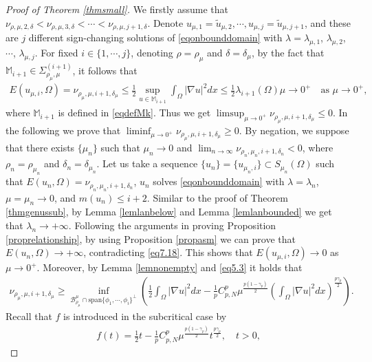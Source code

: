 \documentclass[10pt,a4paper]{amsart}
\newcommand{\B}{\mathcal{B}}
\newcommand{\ga}{\gamma}
\newcommand{\la}{\lambda}
\begin{document}
\begin{proof}[Proof of Theorem \ref{thmsmall}]
We firstly assume that $\nu_{\rho,\mu,2,\delta} < \nu_{\rho,\mu,3,\delta} < \cdots < \nu_{\rho,\mu,j+1,\delta}$. Denote $u_{\mu,1} = \tilde u_{\mu,2}, \cdots, u_{\mu,j} = \tilde u_{\mu,j+1}$, and these are $j$ different sign-changing solutions of \eqref{eqonbounddomain} with $\la = \la_{\mu,1}$, $\la_{\mu,2}$, $\cdots$, $\la_{\mu,j}$. For fixed $i \in \{1,\cdots,j\}$,  denoting $\rho = \rho_\mu$ and $\delta = \delta_\mu$, by the fact that $\mathbb{M}_{i+1}  \in \Sigma_{\rho_\mu,\mu}^{(i+1)}$, it follows that
\begin{align} \label{eq7.18}
	E(u_{\mu,i},\Omega) = \nu_{\rho_\mu,\mu,i+1,\delta_\mu} \le \frac12 \sup_{u \in \mathbb{M}_{i+1}}\int_\Omega |\nabla u|^2dx \le \frac12\la_{i+1}(\Omega) \mu \to 0^+ \quad \text{as } \mu \to 0^+,
\end{align}
where $\mathbb{M}_{i+1}$ is defined in \eqref{eqdefMk}. Thus we get $\limsup_{\mu \to 0^+}\nu_{\rho_\mu,\mu,i+1,\delta_\mu} \le 0$. In the following we prove that $\liminf_{\mu \to 0^+}\nu_{\rho_\mu,\mu,i+1,\delta_\mu} \ge 0$. By negation, we suppose that there exists $\{\mu_n\}$ such that $\mu_n \to 0$ and $\lim_{n \to \infty}\nu_{\rho_n,\mu_n,i+1,\delta_n} < 0$, where $\rho_n = \rho_{\mu_n}$ and $\delta_n = \delta_{\mu_n}$. Let us take a sequence $\{u_n\} = \{u_{\mu_n,i}\} \subset S_{\mu_n}(\Omega)$ such that $E(u_n,\Omega) = \nu_{\rho_n,\mu_n,i+1,\delta_n}$, $u_n$ solves \eqref{eqonbounddomain} with $\la = \la_n$, $\mu = \mu_n \to 0$, and $m(u_n) \le i+2$. Similar to the proof of Theorem \ref{thmgenussub}, by Lemma \ref{lemlanbelow} and Lemma \ref{lemlanbounded} we get that $\la_n \to +\infty$. Following the arguments in proving Proposition \ref{proprelationship}, by using Proposition \ref{propasm} we can prove that $E(u_n,\Omega) \to +\infty$, contradicting \eqref{eq7.18}. This shows that $E(u_{\mu,i},\Omega) \to 0$ as $\mu \to 0^+$. Moreover, by Lemma \ref{lemnonempty} and \eqref{eq5.3} it holds that
\begin{align} \label{eqnuineq}
	\nu_{\rho_\mu,\mu,i+1,\delta_\mu} \geq \inf_{\B_{\rho_\mu}^\mu \cap \text{span}\{\phi_1,\cdots,\phi_{i}\}^{\bot}}\left( \frac12 \int_\Omega |\nabla u|^2dx - \frac1p C_{p,N}^p \mu^{\frac{p(1-\ga_p)}{2}}\left( \int_\Omega |\nabla u|^2dx\right) ^{\frac{p\ga_p}{2}} \right).
\end{align}
Recall that $f$ is introduced in the subcritical case by
\begin{align*}
	f(t) = \frac12 t - \frac1p C_{p,N}^p \mu^{\frac{p(1-\ga_p)}{2}}t ^{\frac{p\ga_p}{2}}, \quad t > 0,
\end{align*}

\end{proof}
\end{document}
